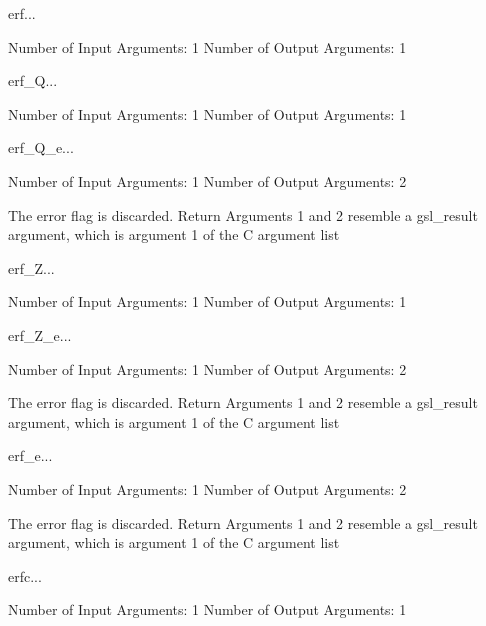 \begin{funcdesc}{erf}{...}

    Number of Input  Arguments:  1
    Number of Output Arguments:  1
\end{funcdesc}

\begin{funcdesc}{erf_Q}{...}

    Number of Input  Arguments:  1
    Number of Output Arguments:  1
\end{funcdesc}

\begin{funcdesc}{erf_Q_e}{...}

    Number of Input  Arguments:  1
    Number of Output Arguments:  2

The error flag is discarded.
Return Arguments 1 and 2 resemble a gsl_result argument,
	which is  argument 1 of the C argument list

\end{funcdesc}

\begin{funcdesc}{erf_Z}{...}

    Number of Input  Arguments:  1
    Number of Output Arguments:  1
\end{funcdesc}

\begin{funcdesc}{erf_Z_e}{...}

    Number of Input  Arguments:  1
    Number of Output Arguments:  2

The error flag is discarded.
Return Arguments 1 and 2 resemble a gsl_result argument,
	which is  argument 1 of the C argument list

\end{funcdesc}

\begin{funcdesc}{erf_e}{...}

    Number of Input  Arguments:  1
    Number of Output Arguments:  2

The error flag is discarded.
Return Arguments 1 and 2 resemble a gsl_result argument,
	which is  argument 1 of the C argument list

\end{funcdesc}

\begin{funcdesc}{erfc}{...}

    Number of Input  Arguments:  1
    Number of Output Arguments:  1
\end{funcdesc}

